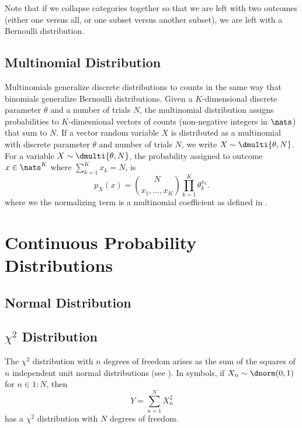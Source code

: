 Note that if we collapse categories together so that we
are left with two outcomes (either one versus all, or
one subset versus another subset), we are left with
a Bernoulli distribution.


\subsection{Multinomial Distribution}

Multinomials generalize discrete distributions to counts in the same
way that binomials generalize Bernoulli distributions.  Given a
$K$-dimensional discrete parameter $\theta$ and a number of trials
$N$, the multinomial distribution assigns probabilities to
$K$-dimesnional vectors of counts (non-negative integers in $\nats$)
that sum to $N$.  If a vector random variable $X$ is distributed as a
multinomial with discrete parameter $\theta$ and number of trials $N$,
we write $X \sim \dmulti{\theta,N}$.  For a variable $X \sim
\dmulti{\theta,N}$, the probability assigned to outcome $x \in
\nats^K$ where $\sum_{k=1}^K x_k = N$, is
%
\begin{equation}
p_X(x) = {N \choose {x_1,\ldots,x_K}} \prod_{k=1}^K \theta_k^{x_k}.
\end{equation}
%
where we the normalizing term is a multinomial coefficient as defined
in .






\section{Continuous Probability Distributions}

\subsection{Normal Distribution}\label{section:stats-normal-distribution}



\subsection{$\chi^2$ Distribution}\label{section:stats-chi-squared-distribution}

The $\chi^2$ distribution with $n$ degrees of freedom arises as the
sum of the squares of $n$ independent unit normal distributions (see
).  In symbols, if $X_n \sim \dnorm(0,1)$
for $n \in 1{:}N$, then 
%
\begin{equation}
Y = \sum_{n=1}^N X_n^2
\end{equation}
%
has a $\chi^2$ distribution with $N$ degrees of freedom.

